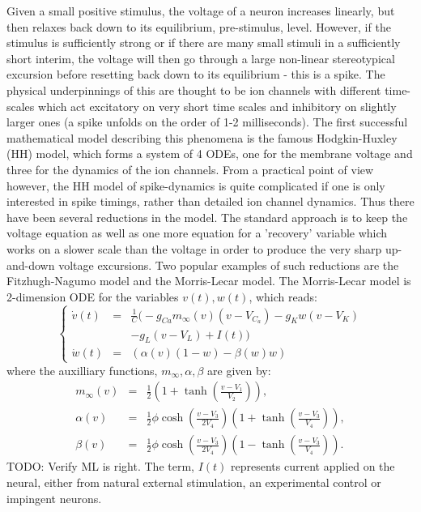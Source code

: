 Given a small positive stimulus, the voltage of a neuron increases linearly, but
then relaxes back down to its equilibrium, pre-stimulus, level. However, if the
stimulus is sufficiently strong or if there are many small stimuli in a
sufficiently short interim, the voltage will then go through a large
 non-linear stereotypical excursion before resetting back down to its equilibrium
 - this is a spike. The physical underpinnings of this are thought to be ion
 channels with different time-scales which act excitatory on very short time
 scales and inhibitory on slightly larger ones (a spike unfolds on the order of
 1-2 milliseconds). The first successful mathematical model describing this
 phenomena is the famous Hodgkin-Huxley (HH) model, which forms a system of 4
 ODEs, one for the membrane voltage and three for the dynamics of the ion
 channels. From a practical point of view however, the HH model of
 spike-dynamics is quite complicated if one is only interested in spike timings,
 rather than detailed ion channel dynamics. Thus there have been several
 reductions in the model. The standard approach is to keep the voltage equation
 as well as one more equation for a 'recovery' variable which works on a slower
 scale than the voltage in order to produce the very sharp up-and-down voltage
 excursions. Two popular examples of such reductions are the Fitzhugh-Nagumo
 model and the Morris-Lecar model. The Morris-Lecar model
 is 2-dimension ODE for the variables $v(t), w(t)$, which reads:
\begin{equation}
\left\{
\begin{array}{ccl}
\dot{v}(t)  &=& \frac{1}{C}\Big(-g_{Ca}m_\infty(v) (v-V_{C_a}) -
g_K w (v-V_K) \\ && 
-g_L(v-V_L)+I(t)  \Big) \\
\dot{w}(t)&=&\left(\alpha(v)(1-w) - \beta(w)w\right)
\end{array}
\right.
\label{eq:ML_original_deterministic}
\end{equation}
where the auxilliary functions, $m_\infty, \alpha, \beta$ are given by:
\begin{eqnarray*}
m_\infty(v)&=&\frac{1}{2}\left(1+\tanh\left(\frac{v-V_1}{V_2}\right)\right),\\
\alpha(v) &=& \frac{1}{2}\phi \cosh\left(\frac{v-V_3}{2V_4}\right)\left(1+\tanh\left(\frac{v-V_3}{V_4}\right)\right),\\
\beta(v) &=& \frac{1}{2}\phi \cosh\left(\frac{v-V_3}{2V_4}\right)\left(1-\tanh\left(\frac{v-V_3}{V_4}\right)\right).
\end{eqnarray*}
TODO: Verify ML is right. 
The term, $I(t)$ represents current applied on the neural, either from natural
external stimulation, an experimental control or impingent neurons. 


